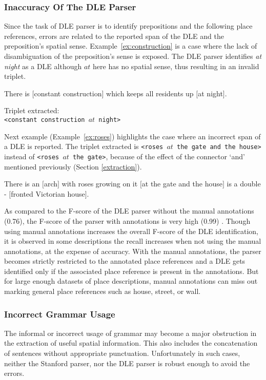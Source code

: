 \documentclass{acm_proc_article-sp}
\begin{document}
\subsubsection{Inaccuracy Of The DLE Parser}
Since the task of DLE parser is to identify prepositions and the following place references, errors are related to the reported span of the DLE and the preposition's spatial sense. Example~\ref{ex:construction} is a case where the lack of disambiguation of the preposition's sense is exposed. The DLE parser identifies \textit{at night} as a DLE although $at$ here has no spatial sense, thus resulting in an invalid triplet.
\label{subsub:DLE}
\begin{example}
\label{ex:construction}
There is $[$constant construction$]$ which keeps all residents up $[$at night$]$.
\end{example}
Triplet extracted:\\
\texttt{<constant construction $at$ night>}

Next example (Example~\ref{ex:roses}) highlights the case where an incorrect span of a DLE is reported. The triplet extracted is \texttt{<roses $at$ the gate and the house>} instead of \texttt{<roses $at$ the gate>}, because of the effect of the connector `and' mentioned previously (Section \ref{extraction}).
\begin{example}
\label{ex:roses}
There is an $[$arch$]$ with roses growing on it $[$at the gate and the house$]$ is a double - $[$fronted Victorian house$]$.
\end{example}
As compared to the F-score of the DLE parser without the manual annotations (0.76), the F-score of the parser with annotations is very high (0.99) \cite{fei:locative}.
Though using manual annotations increases the overall F-score of the DLE identification, it is observed in some descriptions the recall increases when not using the manual annotations, at the expense of accuracy. With the manual annotations, the parser becomes strictly restricted to the annotated place references and a DLE gets identified only if the associated place reference is present in the annotations. But for large enough datasets of place descriptions, manual annotations can miss out marking general place references such as house, street, or wall.
\subsubsection{Incorrect Grammar Usage}
The informal or incorrect usage of grammar may become a major obstruction in the extraction of useful spatial information. This also includes the concatenation of sentences without appropriate punctuation. Unfortunately in such cases, neither the Stanford parser, nor the DLE parser is robust enough to avoid the errors.
\end{document}
